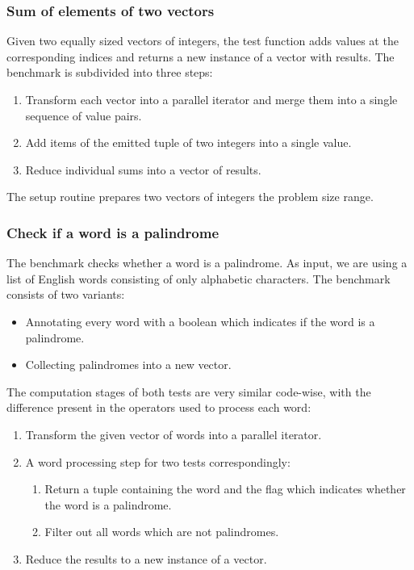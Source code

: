 \subsubsection*{Sum of elements of two vectors}
Given two equally sized vectors of integers, the test function adds values at the corresponding indices and returns a new instance of a vector with results. The benchmark is subdivided into three steps:

\begin{enumerate}
    \item Transform each vector into a parallel iterator and merge them into a single sequence of value pairs.
    \item Add items of the emitted tuple of two integers into a single value.
    \item Reduce individual sums into a vector of results.
\end{enumerate}

The setup routine prepares two vectors of integers the \range{[0, N]} problem size range.

\subsubsection*{Check if a word is a palindrome}
The benchmark checks whether a word is a palindrome. As input, we are using a list of English words consisting of only alphabetic characters. The benchmark consists of two variants:
\begin{itemize}
    \item Annotating every word with a boolean which indicates if the word is a palindrome.
    \item Collecting palindromes into a new vector.
\end{itemize}

The computation stages of both tests are very similar code-wise, with the difference present in the operators used to process each word:

\begin{enumerate}
    \item Transform the given vector of words into a parallel iterator.
    \item A word processing step for two tests correspondingly:
    \begin{enumerate}
        \item Return a tuple containing the word and the flag which indicates whether the word is a palindrome.
        \item Filter out all words which are not palindromes.
    \end{enumerate}
    \item Reduce the results to a new instance of a vector.
\end{enumerate}

